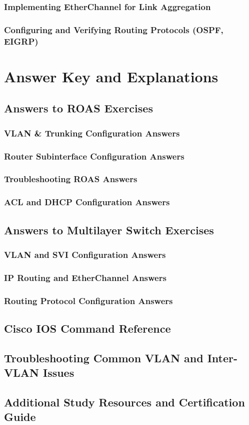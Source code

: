 \documentclass[a4paper]{report}
\begin{document}
\section{Implementing EtherChannel for Link Aggregation}
\section{Configuring and Verifying Routing Protocols (OSPF, EIGRP)}

\part{Answer Key and Explanations}

\chapter{Answers to ROAS Exercises}
\section{VLAN \& Trunking Configuration Answers}
\section{Router Subinterface Configuration Answers}
\section{Troubleshooting ROAS Answers}
\section{ACL and DHCP Configuration Answers}

\chapter{Answers to Multilayer Switch Exercises}
\section{VLAN and SVI Configuration Answers}
\section{IP Routing and EtherChannel Answers}
\section{Routing Protocol Configuration Answers}

\appendix
\chapter{Cisco IOS Command Reference}
\chapter{Troubleshooting Common VLAN and Inter-VLAN Issues}
\chapter{Additional Study Resources and Certification Guide}
\end{document}
